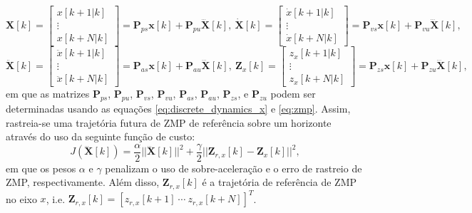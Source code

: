 \begin{equation}
\mathrm{\mathbf{X}}[k] = \begin{bmatrix}
x[k+1|k] \\
\vdots \\
x[k+N|k]
\end{bmatrix} = \mathrm{\mathbf{P}}_{ps} \mathrm{\mathbf{x}}[k] + \mathrm{\mathbf{P}}_{pu} \dddot{\mathrm{\mathbf{X}}}[k], \
\dot{\mathrm{\mathbf{X}}}[k] = \begin{bmatrix}
\dot{x}[k+1|k] \\
\vdots \\
\dot{x}[k+N|k]
\end{bmatrix} = \mathrm{\mathbf{P}}_{vs} \mathrm{\mathbf{x}}[k] + \mathrm{\mathbf{P}}_{vu} \dddot{\mathrm{\mathbf{X}}}[k],
\label{eq:dx_pred}
\end{equation}
\begin{equation}
\ddot{\mathrm{\mathbf{X}}}[k] = \begin{bmatrix}
\ddot{x}[k+1|k] \\
\vdots \\
\ddot{x}[k+N|k]
\end{bmatrix} = \mathrm{\mathbf{P}}_{as} \mathrm{\mathbf{x}}[k] + \mathrm{\mathbf{P}}_{au} \dddot{\mathrm{\mathbf{X}}}[k], \
\mathrm{\mathbf{Z}}_x[k] = \begin{bmatrix}
z_x[k+1|k] \\
\vdots \\
z_x[k+N|k]
\end{bmatrix} = 
\mathrm{\mathbf{P}}_{zs} \mathrm{\mathbf{x}}[k] + \mathrm{\mathbf{P}}_{zu} \dddot{\mathrm{\mathbf{X}}}[k],
\label{eq:zx_pred}
\end{equation}
em que as matrizes \( \mathrm{\mathbf{P}}_{ps} \), \( \mathrm{\mathbf{P}}_{pu} \), \( \mathrm{\mathbf{P}}_{vs} \), \( \mathrm{\mathbf{P}}_{vu} \), \( \mathrm{\mathbf{P}}_{as} \), \( \mathrm{\mathbf{P}}_{au} \), \( \mathrm{\mathbf{P}}_{zs} \), e \( \mathrm{\mathbf{P}}_{zu} \) podem ser determinadas usando as equações \eqref{eq:discrete_dynamics_x} e \eqref{eq:zmp}. Assim, rastreia-se uma trajetória futura de ZMP de referência sobre um horizonte através do uso da seguinte função de custo:
\begin{equation}
J \left( \dddot{\mathrm{\mathbf{X}}}[k] \right) = \frac{\alpha}{2} || \dddot{\mathrm{\mathbf{X}}}[k] ||^2 + \frac{\gamma}{2} || \mathrm{\mathbf{Z}}_{r,x}[k] - \mathrm{\mathbf{Z}}_x[k] ||^2,
\label{eq:optimization_preview}
\end{equation}
em que os pesos \( \alpha \) e \( \gamma \) penalizam o uso de sobre-aceleração e o erro de rastreio de ZMP, respectivamente. Além disso, \( \mathrm{\mathbf{Z}}_{r,x}[k] \) é a trajetória de referência de ZMP no eixo \( x \), i.e. \( \mathrm{\mathbf{Z}}_{r,x}[k] = \left[z_{r,x}[k+1] \ \cdots \ z_{r,x}[k+N] \right]^T \).

